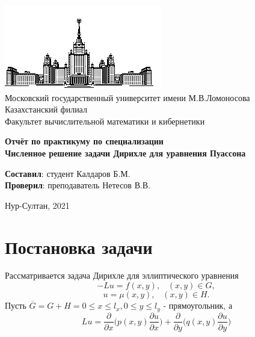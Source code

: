 \documentclass[a4paper, 12pt]{article}
\date{Сентябрь 2020}
\begin{document}
	
	\begin{titlepage}
		\begin{center}
			\includegraphics{msu_logo.jpg}
			\small
			~\\[0.1cm]
			Московский государственный университет имени М.В.Ломоносова
			~\\[0.1cm]
			Казахстанский филиал
			~\\[0.1cm]
			Факультет вычислительной математики и кибернетики
			~\\[1.0cm]
			\normalsize
		\end{center}
		\vspace{0.5cm}
		\begin{center}
			\textbf{\large{Отчёт по практикуму по специализации}}
			\\[1cm]
			\textbf{\large {Численное решение задачи Дирихле для уравнения
					Пуассона}}
			\\[2cm]
			\begin{normalsize}
				\vspace{2cm}
				\begin{flushright}
					\textbf{Составил}: студент Калдаров Б.М.
					\\[1cm]
					\textbf{Проверил}: преподаватель Нетесов В.В.
				\end{flushright}
				\normalsize
			\end{normalsize}
			\vfill 
			
			\small{Нур-Султан, 2021}
		\end{center} 
	\end{titlepage}
	\setcounter{page}{2}
	\tableofcontents
	
	\newpage
	\section{Постановка задачи}
	Рассматривается задача Дирихле для эллиптического уравнения
	\begin{equation}
		-Lu = f(x, y), \;\;\; (x, y) \in G,
	\end{equation}
	\begin{equation}
		u = \mu(x, y), \;\;\; (x, y) \in H.
	\end{equation}
	Пусть $\overline{G} = G + H = {0 \le x \le l_x, 0 \le y \le l_y}$ - прямоугольник, а
	\begin{equation}
		Lu = \frac{\partial}{\partial x} \bigg( p(x, y) \frac{\partial u}{\partial x} \bigg) + \frac{\partial}{\partial y} \bigg( q(x, y) \frac{\partial u}{\partial y} \bigg)
	\end{equation}
	
\end{document}
